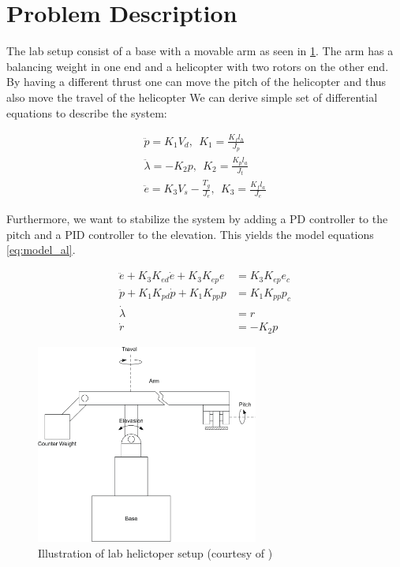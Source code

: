\section{Problem Description}

The lab setup consist of a base with a movable arm as seen in \cref{fig:heli_setup}. The arm has a balancing weight in one end and a helicopter with two rotors on the other end. By having a different thrust one can move the pitch of the helicopter and thus also move the travel of the helicopter We can derive simple set of differential equations to describe the system:

\begin{subequations}
    \begin{gather}
        \ddot p=K_1V_d, \ \  K_1=\frac{K_fl_h}{J_p}\\
        \ddot\lambda = -K_2p, \ \  K_2=\frac{K_pl_a}{J_t}\\
        \ddot e =K_3 V_s-\frac{T_g}{J_e}, \ \  K_3=\frac{K_fl_a}{J_e}
    \end{gather}
\end{subequations}

Furthermore, we want to stabilize the system by adding a PD controller to the pitch and a PID controller to the elevation. This yields the model equations \cref{eq:model_al}.

\begin{subequations}\label{eq:model_al}
	\begin{align}
    \ddot{e} + K_3 K_{ed}\dot{e} + K_3 K_{ep} e &= K_3 K_{ep} e_c \\
		\ddot{p} + K_{1} K_{pd} \dot{p} + K_{1} K_{pp} p &= K_{1} K_{pp} p_{c} \label{eq:model_se_al_pitch} \\
		\dot{\lambda} &= r \label{eq:model_se_al_lambda} \\
		\dot{r} &= -K_{2} p \label{eq:model_se_al_r}
	\end{align}
\end{subequations}

\begin{figure}[h]
    \centering
    \includegraphics[width = 0.65\textwidth]{fig/lab_setup.png}
    \caption{Illustration of lab helictoper setup (courtesy of \cite{Assignment-text})}
    \label{fig:heli_setup}
\end{figure}
